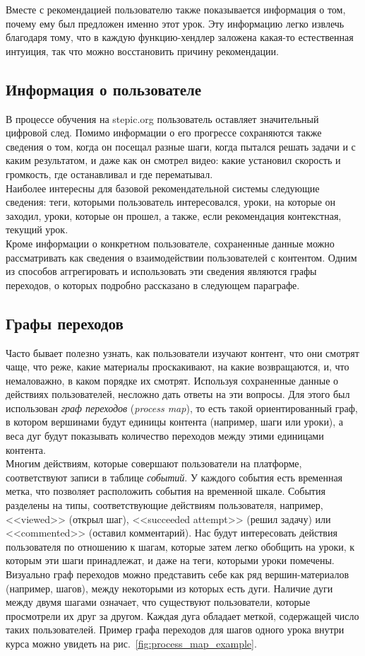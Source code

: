 \documentclass[14pt]{matmex-diploma}
\begin{document}
\indent Вместе с рекомендацией пользователю также показывается информация о том, почему ему был предложен именно этот урок. Эту информацию легко извлечь благодаря тому, что в каждую функцию-хендлер заложена какая-то естественная интуиция, так что можно восстановить причину рекомендации.
\subsection{Информация о пользователе}
В процессе обучения на stepic.org пользователь оставляет значительный цифровой след. Помимо информации о его прогрессе сохраняются также сведения о том, когда он посещал разные шаги, когда пытался решать задачи и с каким результатом, и даже как он смотрел видео: какие установил скорость и громкость, где останавливал и где перематывал. 
\\\indent Наиболее интересны для базовой рекомендательной системы следующие сведения: теги, которыми пользователь интересовался, уроки, на которые он заходил, уроки, которые он прошел, а также, если рекомендация контекстная, текущий урок.
\\\indent Кроме информации о конкретном пользователе, сохраненные данные можно рассматривать как сведения о взаимодействии пользователей с контентом. Одним из способов аггрегировать и использовать эти сведения являются графы переходов, о которых подробно рассказано в следующем параграфе.


\subsection{Графы переходов}
\indent Часто бывает полезно узнать, как пользователи изучают контент, что они смотрят чаще, что реже, какие материалы проскакивают, на какие возвращаются, и, что немаловажно, в каком порядке их смотрят. Используя сохраненные данные о действиях пользователей, несложно дать ответы на эти вопросы. Для этого был использован \textit{граф переходов} (\textit{process map}), то есть такой ориентированный граф, в котором вершинами будут единицы контента (например, шаги или уроки), а веса дуг будут показывать количество переходов между этими единицами контента.
\\\indent Многим действиям, которые совершают пользователи на платформе, соответствуют записи в таблице \textit{событий}. У каждого события есть временная метка, что позволяет расположить события на временной шкале. События разделены на типы, соответствующие действиям пользователя, например, <<viewed>> (открыл шаг), <<succeeded attempt>> (решил задачу) или <<commented>> (оставил комментарий). Нас будут интересовать действия пользователя по отношению к шагам, которые затем легко обобщить на уроки, к которым эти шаги принадлежат, и даже на теги, которыми уроки помечены.
\\\indent Визуально граф переходов можно представить себе как ряд вершин-материалов (например, шагов), между некоторыми из которых есть дуги. Наличие дуги между двумя шагами означает, что существуют пользователи, которые просмотрели их друг за другом. Каждая дуга обладает меткой, содержащей число таких пользователей. Пример графа переходов для шагов одного урока внутри курса можно увидеть на рис.~\ref{fig:process_map_example}.
\end{document}
